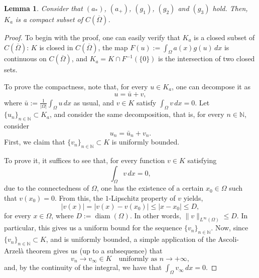 \documentclass[11pt,reqno]{amsart}
\theoremstyle{plain}
\newtheorem{lemma}[theorem]{Lemma}
\theoremstyle{definition}
\numberwithin{equation}{section}
\newcommand{\N}{\mathbb{N}}
\begin{document}
\begin{lemma} \label{lemma:compactness}
    Consider that $(a_*)$, $(a_+)$, $(g_1)$, $(g_2)$ and $(g_3)$ hold. Then, $K_a$ is a compact subset of $C(\overline{\Omega})$.
\end{lemma}

\begin{proof}
    To begin with the proof, one can easily verify that $K_a$ is a closed subset of $C(\overline{\Omega})$: $K$ is closed in $C(\overline{\Omega})$, the map $F(u) := \int_\Omega a(x) g(u) \, dx$ is continuous on $C(\overline{\Omega})$, and $K_a = K \cap F^{-1}(\{0\})$ is the intersection of two closed sets.

    \medskip

    To prove the compactness, note that, for every $u \in K_a$, one can decompose it as
    $$u = \bar u + v,$$
    where $\bar u:= \frac{1}{|\Omega|} \int_\Omega u \, dx$ as usual, and $v\in K$ satisfy $\int_\Omega v \, dx = 0$. Let $\{u_n\}_{n \in \N} \subset K_a$, and consider the same decomposition, that is, for every $n \in \N$, consider \begin{equation} \label{eq:un} u_n = \bar u_n + v_n. \end{equation} First, we claim that $\{v_n\}_{n \in \N} \subset K$ is uniformly bounded.

\medskip

    To prove it, it suffices to see that, for every function $v \in K$ satisfying 
    $$\int_\Omega v \, dx = 0,$$
    due to the connectedness of $\Omega$, one has the existence of a certain $x_0 \in \Omega$ such that $v(x_0) = 0$. From this, the $1$-Lipschitz property of $v$ yields, 
    $$|v(x)| = |v(x) - v(x_0)| \leq |x-x_0| \leq D,$$
    for every $x \in \Omega$, where $D := \operatorname{diam}(\Omega)$. In other words, $\|v\|_{L^\infty(\Omega)} \leq D.$ In particular, this gives us a uniform bound for the sequence $\{v_n\}_{n \in \N}$. Now, since $\{v_n\}_{n \in \N} \subset K$, and is uniformly bounded, a simple application of the Ascoli-Arzelà theorem gives us (up to a subsequence) that
    $$v_n \to v_\infty \in K \quad \text{uniformly as } n \to + \infty, $$
    and, by the continuity of the integral, we have that $\int_\Omega v_\infty \, dx = 0$. 


\end{proof}
\end{document}
